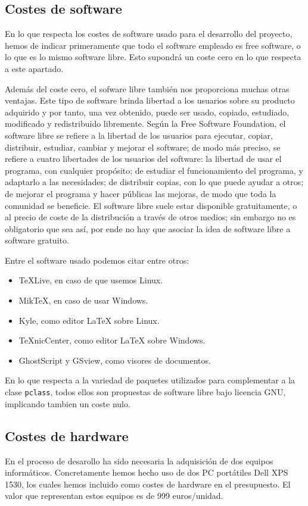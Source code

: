 		
	\subsection{Costes de software}
	En lo que respecta los costes de software usado para el desarrollo del proyecto, hemos de indicar primeramente
	que todo el software empleado es free software, o lo que es lo mismo software libre. Esto  supondr\'a un coste cero
	en lo que respecta a este apartado.
	
	Adem\'as del coste cero, el sofware libre tambi\'en nos proporciona muchas otras ventajas. Este tipo de software 
	brinda libertad a los usuarios sobre su producto adquirido y por tanto, una vez obtenido, puede ser usado, copiado,
	estudiado, modificado y redistribuido libremente. Seg\'un la Free Software Foundation, el software libre se refiere 
	a la libertad de los usuarios para ejecutar, copiar, distribuir, estudiar, cambiar y mejorar el software; de modo 
	m\'as preciso, se refiere a cuatro libertades de los usuarios del software: la libertad de usar el programa, 
	con cualquier prop\'osito; de estudiar el funcionamiento del programa, y adaptarlo a las necesidades; de distribuir 
	copias, con lo que puede ayudar a otros; de mejorar el programa y hacer p\'ublicas las mejoras, de modo que toda la 
	comunidad se beneficie. El software libre suele estar disponible gratuitamente, o al precio de coste de la distribuci\'on 
	a trav\'es de otros medios; sin embargo no es obligatorio que sea as\'i, por ende no hay que asociar la idea de 
	software libre a software gratuito.  
	 
 	Entre el software usado podemos citar entre otros:
 	
\begin{itemize}
	\item \TeX{}Live, en caso de que usemos Linux.
	\item Mik\TeX{}, en caso de usar Windows.
	\item Kyle, como editor \LaTeX{} sobre Linux.
	\item \TeX{}nicCenter, como editor \LaTeX{} sobre Windows.
	\item GhostScript y GSview, como visores de documentos.
\end{itemize}
 	
	En lo que respecta a la variedad de paquetes utilizados para complementar a la clase \texttt{pclass}, todos ellos
	son propuestas de software libre bajo licencia GNU, implicando tambien un coste nulo.
	
	
	\subsection{Costes de hardware}
	En el proceso de desarollo ha sido necesaria la adquisici\'on de dos equipos inform\'aticos. Concretamente hemos 
	hecho uso de dos PC port\'atiles Dell XPS 1530, los cuales hemos incluido como costes de hardware en el presupuesto.
	El valor que representan estos equipos es de 999 euros/unidad.
	
